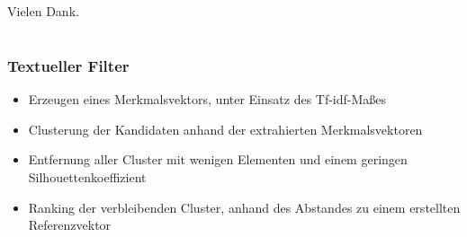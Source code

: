 \documentclass[utf8]{beamer}
\begin{document}
\section*{}
\begin{frame}
    \begin{center}
        \Huge Vielen Dank.
    \end{center}
\end{frame}

\section*{}

\begin{frame}
  \frametitle{Textueller Filter}
  \begin{itemize}
      \item Erzeugen eines Merkmalsvektors, unter Einsatz des Tf-idf-Maßes
      \item Clusterung der Kandidaten anhand der extrahierten Merkmalsvektoren
      \item Entfernung aller Cluster mit wenigen Elementen und einem geringen Silhouettenkoeffizient
      \item Ranking der verbleibenden Cluster, anhand des Abstandes zu einem erstellten Referenzvektor
  \end{itemize}
\end{frame}
\end{document}
